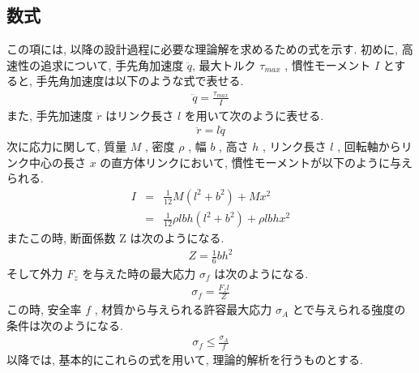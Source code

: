 \documentclass[10pt,b5paper,papersize,dvipdfmx]{jsbook}
\begin{document}
\subsection{数式}\label{数式}
この項には, 以降の設計過程に必要な理論解を求めるための式を示す. 初めに, 高速性の追求について, 手先角加速度 $\ddot{q}$, 最大トルク $\tau_{max}$ , 慣性モーメント $I$ とすると, 手先角加速度は以下のような式で表せる.
\begin{align}
\ddot{q}=\frac{\tau_{max}}{I}
\end{align}
また, 手先加速度 $\ddot{r}$ はリンク長さ $l$ を用いて次のように表せる.
\begin{align}
\ddot{r}=l\ddot{q}
\end{align}
次に応力に関して, 質量 $M$ , 密度 $\rho$ , 幅 $b$ , 高さ $h$ , リンク長さ $l$ , 回転軸からリンク中心の長さ $x$ の直方体リンクにおいて, 慣性モーメントが以下のように与えられる.
\begin{eqnarray}
  I&=&\frac{1}{12}M(l^2+b^2)+Mx^2\\
  &=&\frac{1}{12} \rho lbh(l^2+b^2 )+\rho lbhx^2
\end{eqnarray}
またこの時, 断面係数 Z は次のようになる.
\begin{align}
  Z=\frac{1}{6}bh^2
\end{align}
そして外力 $F_z$ を与えた時の最大応力 $\sigma_f$ は次のようになる.
\begin{align}
  \sigma_f=\frac{F_zl}{Z}
\end{align}
この時, 安全率 $f$ , 材質から与えられる許容最大応力 $\sigma_A$ とで与えられる強度の条件は次のようになる.
\begin{align}
  \sigma_f\leq\frac{\sigma_A}{f}
\end{align}
以降では, 基本的にこれらの式を用いて, 理論的解析を行うものとする.
\end{document}
